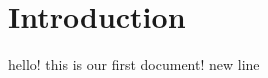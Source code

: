 



\section{Introduction}

hello! this is our first document!
new line ~\cite{blom2006detection}


